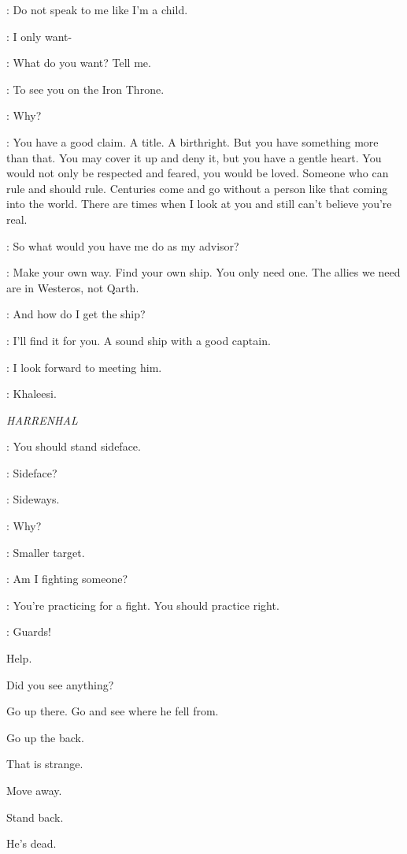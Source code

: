 \DAENERYS: Do not speak to me like I'm a child. 

\JORAH: I only want- 

\DAENERYS: What do you want? Tell me. 

\JORAH: To see you on the Iron Throne. 

\DAENERYS: Why? 

\JORAH: You have a good claim. A title. A birthright. But you have something more than that. You may cover it up and deny it, but you have a gentle heart. You would not only be respected and feared, you would be loved. Someone who can rule and should rule. Centuries come and go without a person like that coming into the world. There are times when I look at you and still can't believe you're real. 

\DAENERYS: So what would you have me do as my advisor? 

\JORAH: Make your own way. Find your own ship. You only need one. The allies we need are in Westeros, not Qarth. 

\DAENERYS: And how do I get the ship? 

\JORAH: I'll find it for you. A sound ship with a good captain. 

\DAENERYS: I look forward to meeting him. 

\JORAH: Khaleesi. 



\scene

\textit{HARRENHAL} 


\ARYA: You should stand sideface. 

\GENDRY: Sideface? 

\ARYA: Sideways. 

\GENDRY: Why? 

\ARYA: Smaller target. 

\GENDRY: Am I fighting someone? 

\ARYA: You're practicing for a fight. You should practice right. 


\VOICES: Guards! 

Help. 

Did you see anything? 

Go up there. Go and see where he fell from. 

Go up the back. 

That is strange. 

Move away. 

Stand back. 

He's dead. 


